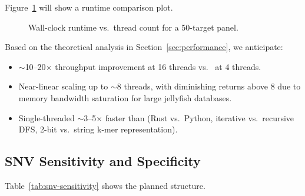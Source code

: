 
Figure~\ref{fig:runtime-placeholder} will show a runtime comparison plot.

\begin{figure}[h]
  \centering
  \caption{Wall-clock runtime vs.\ thread count for a 50-target panel.
    }
  \label{fig:runtime-placeholder}
\end{figure}

Based on the theoretical analysis in Section~\ref{sec:performance}, we
anticipate:
\begin{itemize}
  \item $\sim$10--20$\times$ throughput improvement at 16 threads vs.\ \km{}
    at 4 threads.
  \item Near-linear scaling up to $\sim$8 threads, with diminishing returns
    above 8 due to memory bandwidth saturation for large jellyfish databases.
  \item Single-threaded \kmerdet{} $\sim$3--5$\times$ faster than \km{} (Rust
    vs.\ Python, iterative vs.\ recursive DFS, 2-bit vs.\ string k-mer
    representation).
\end{itemize}

\subsection{SNV Sensitivity and Specificity}
\label{sec:results-snv}


Table~\ref{tab:snv-sensitivity} shows the planned structure.

